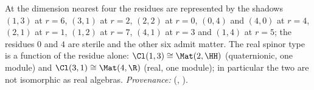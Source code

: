 At the dimension nearest four the residues are represented by the shadows $(1,3)$ at $r = 6$, $(3,1)$ at $r = 2$, $(2,2)$ at $r = 0$, $(0,4)$ and $(4,0)$ at $r = 4$, $(2,1)$ at $r = 1$, $(1,2)$ at $r = 7$, $(4,1)$ at $r = 3$ and $(1,4)$ at $r = 5$; the residues $0$ and $4$ are sterile and the other six admit matter. The real spinor type is a function of the residue alone: $\Cl(1,3) \cong \Mat(2,\HH)$ (quaternionic, one module) and $\Cl(3,1) \cong \Mat(4,\R)$ (real, one module); in particular the two are not isomorphic as real algebras. \emph{Provenance:} \cite[Prop.~3.1, Thm.~3.4]{ButlerT14} (, ).
